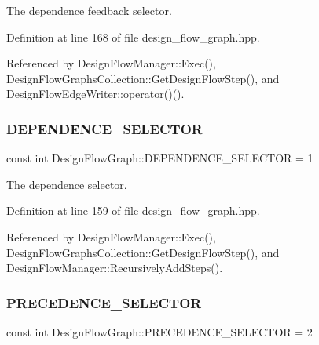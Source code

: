 The dependence feedback selector. 



Definition at line 168 of file design\+\_\+flow\+\_\+graph.\+hpp.



Referenced by Design\+Flow\+Manager\+::\+Exec(), Design\+Flow\+Graphs\+Collection\+::\+Get\+Design\+Flow\+Step(), and Design\+Flow\+Edge\+Writer\+::operator()().

\mbox{\label{classDesignFlowGraph_a2aab30802367c93591da91872908d0d3}} 
\subsubsection{\texorpdfstring{D\+E\+P\+E\+N\+D\+E\+N\+C\+E\+\_\+\+S\+E\+L\+E\+C\+T\+OR}{DEPENDENCE\_SELECTOR}}
{\footnotesize\ttfamily const int Design\+Flow\+Graph\+::\+D\+E\+P\+E\+N\+D\+E\+N\+C\+E\+\_\+\+S\+E\+L\+E\+C\+T\+OR = 1\hspace{0.3cm}{\ttfamily [static]}}



The dependence selector. 



Definition at line 159 of file design\+\_\+flow\+\_\+graph.\+hpp.



Referenced by Design\+Flow\+Manager\+::\+Exec(), Design\+Flow\+Graphs\+Collection\+::\+Get\+Design\+Flow\+Step(), and Design\+Flow\+Manager\+::\+Recursively\+Add\+Steps().

\mbox{\label{classDesignFlowGraph_abfaee97fab8108e75a99de29d463a1a3}} 
\subsubsection{\texorpdfstring{P\+R\+E\+C\+E\+D\+E\+N\+C\+E\+\_\+\+S\+E\+L\+E\+C\+T\+OR}{PRECEDENCE\_SELECTOR}}
{\footnotesize\ttfamily const int Design\+Flow\+Graph\+::\+P\+R\+E\+C\+E\+D\+E\+N\+C\+E\+\_\+\+S\+E\+L\+E\+C\+T\+OR = 2\hspace{0.3cm}{\ttfamily [static]}}




